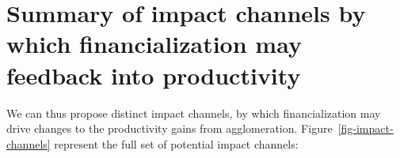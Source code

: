 



\section{Summary of impact channels by which financialization may feedback into productivity} \label{section-impact-channel-summary}

We can thus propose distinct impact channels, by which financialization may drive changes to the productivity gains from agglomeration. Figure~\ref{fig-impact-channels} represent the full set of potential impact channels:

